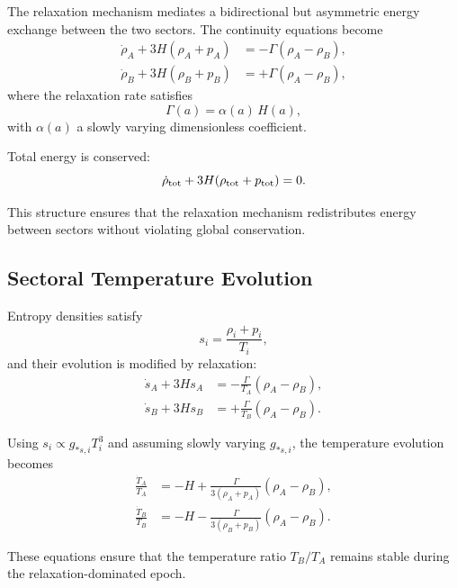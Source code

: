 \documentclass[11pt,a4paper]{article}
\begin{document}
The relaxation mechanism mediates a bidirectional but asymmetric energy exchange between the two sectors. The continuity equations become
\begin{align}
\dot{\rho}_A + 3H(\rho_A + p_A) &= -\Gamma(\rho_A - \rho_B), \\
\dot{\rho}_B + 3H(\rho_B + p_B) &= +\Gamma(\rho_A - \rho_B),
\end{align}
where the relaxation rate satisfies
\begin{equation}
\Gamma(a) = \alpha(a)\,H(a),
\end{equation}
with $\alpha(a)$ a slowly varying dimensionless coefficient.

Total energy is conserved:
\begin{equation}
\dot{\rho}_{\rm tot} + 3H(\rho_{\rm tot} + p_{\rm tot}) = 0.
\end{equation}

This structure ensures that the relaxation mechanism redistributes energy between sectors without violating global conservation.

\subsection{Sectoral Temperature Evolution}

Entropy densities satisfy
\begin{equation}
s_i = \frac{\rho_i + p_i}{T_i},
\end{equation}
and their evolution is modified by relaxation:
\begin{align}
\dot{s}_A + 3H s_A &= -\frac{\Gamma}{T_A}(\rho_A - \rho_B), \\
\dot{s}_B + 3H s_B &= +\frac{\Gamma}{T_B}(\rho_A - \rho_B).
\end{align}

Using $s_i \propto g_{*s,i} T_i^3$ and assuming slowly varying $g_{*s,i}$, the temperature evolution becomes
\begin{align}
\frac{\dot{T}_A}{T_A} &= -H + \frac{\Gamma}{3(\rho_A + p_A)}(\rho_A - \rho_B), \\
\frac{\dot{T}_B}{T_B} &= -H - \frac{\Gamma}{3(\rho_B + p_B)}(\rho_A - \rho_B).
\end{align}

These equations ensure that the temperature ratio $T_B/T_A$ remains stable during the relaxation-dominated epoch.
\end{document}

